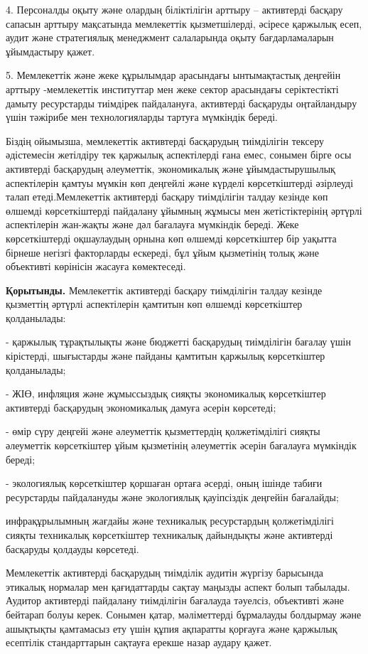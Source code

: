 \begin{multicols}{2}
4. Персоналды оқыту және олардың біліктілігін арттыру -- активтерді
басқару сапасын арттыру мақсатында мемлекеттік қызметшілерді, әсіресе
қаржылық есеп, аудит және стратегиялық менеджмент салаларында оқыту
бағдарламаларын ұйымдастыру қажет.

5. Мемлекеттік және жеке құрылымдар арасындағы ынтымақтастық деңгейін
арттыру -мемлекеттік институттар мен жеке сектор арасындағы
серіктестікті дамыту ресурстарды тиімдірек пайдалануға, активтерді
басқаруды оңтайландыру үшін тәжірибе мен технологияларды тартуға
мүмкіндік береді.

Біздің ойымызша, мемлекеттік активтерді басқарудың тиімділігін тексеру
әдістемесін жетілдіру тек қаржылық аспектілерді ғана емес, сонымен бірге
осы активтерді басқарудың әлеуметтік, экономикалық және ұйымдастырушылық
аспектілерін қамтуы мүмкін көп деңгейлі және күрделі көрсеткіштерді
әзірлеуді талап етеді.Мемлекеттік активтерді басқару тиімділігін талдау
кезінде көп өлшемді көрсеткіштерді пайдалану ұйымның жұмысы мен
жетістіктерінің әртүрлі аспектілерін жан-жақты және дәл бағалауға
мүмкіндік береді. Жеке көрсеткіштерді оқшаулаудың орнына көп өлшемді
көрсеткіштер бір уақытта бірнеше негізгі факторларды ескереді, бұл ұйым
қызметінің толық және объективті көрінісін жасауға көмектеседі.

{\bfseries Қорытынды.} Мемлекеттік активтерді басқару тиімділігін талдау
кезінде қызметтің әртүрлі аспектілерін қамтитын көп өлшемді көрсеткіштер
қолданылады:

- қаржылық тұрақтылықты және бюджетті басқарудың тиімділігін бағалау
үшін кірістерді, шығыстарды және пайданы қамтитын қаржылық көрсеткіштер
қолданылады;

- ЖІӨ, инфляция және жұмыссыздық сияқты экономикалық көрсеткіштер
активтерді басқарудың экономикалық дамуға әсерін көрсетеді;

- өмір сүру деңгейі және әлеуметтік қызметтердің қолжетімділігі сияқты
әлеуметтік көрсеткіштер ұйым қызметінің әлеуметтік әсерін бағалауға
мүмкіндік береді;

- экологиялық көрсеткіштер қоршаған ортаға әсерді, оның ішінде табиғи
ресурстарды пайдалануды және экологиялық қауіпсіздік деңгейін бағалайды;

инфрақұрылымның жағдайы және техникалық ресурстардың қолжетімділігі
сияқты техникалық көрсеткіштер техникалық дайындықты және активтерді
басқаруды қолдауды көрсетеді.

Мемлекеттік активтерді басқарудың тиімділік аудитін жүргізу барысында
этикалық нормалар мен қағидаттарды сақтау маңызды аспект болып табылады.
Аудитор активтерді пайдалану тиімділігін бағалауда тәуелсіз, объективті
және бейтарап болуы керек. Сонымен қатар, мәліметтерді бұрмалауды
болдырмау және ашықтықты қамтамасыз ету үшін құпия ақпаратты қорғауға
және қаржылық есептілік стандарттарын сақтауға ерекше назар аудару
қажет.


\end{multicols}
